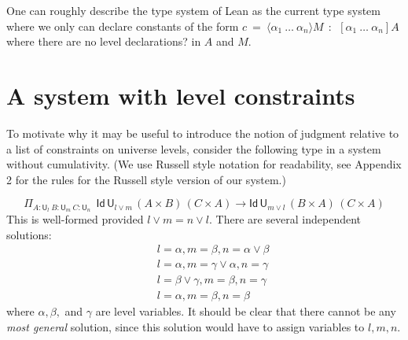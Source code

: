 \documentclass[11pt,a4paper]{article}
\theoremstyle{definition}
\newcommand{\Id}{\mathsf{Id}}
\newcommand{\NN}{\mathsf{N}}
\newcommand{\UU}{\mathsf{U}}
\newcommand{\lam}[1]{{\langle}#1{\rangle}}
\begin{document}
One can roughly describe the type system of Lean \cite{moura:lean,Carneiro19} as the current type system
where we only can declare constants of the form
$c~=~\lam{\alpha_1~\dots~\alpha_n}M~~:~~[\alpha_1~\dots~\alpha_n]A$ where there are no {\color{red}level declarations?} in $A$ and $M$.





\section{A system with level constraints}\label{sec:constraints}

To motivate why it may be useful to introduce the notion of judgment relative to a list of constraints on universe levels, consider the following type in a system without cumulativity. (We use Russell style notation for readability, see Appendix 2 for the rules for the Russell style version of our system.)

$$
    \Pi_{A:\UU_l~{B}:{\UU_m}~{C}:{\UU_n}}
    {~~\Id\,\UU_{l \vee m}\, (A\times B)\,(C \times A)
    \to \Id\,\UU_{m \vee l} \, (B\times A)\,(C \times A)}
$$
This is well-formed provided $l \vee m = n \vee l$.
There are several independent solutions:
\begin{eqnarray*}
&&l = \alpha, m = \beta, n = \alpha \vee \beta\\
&&l = \alpha, m = \gamma \vee \alpha, n = \gamma\\
&&l = \beta \vee \gamma, m = \beta, n = \gamma\\
&&l = \alpha, m = \beta, n = \beta
\end{eqnarray*}
where $\alpha, \beta,$ and $\gamma$ are level
variables. It should be clear that there cannot be any {\em most general} solution, since this solution would have to
assign variables to $l,m,n$.
\end{document}
